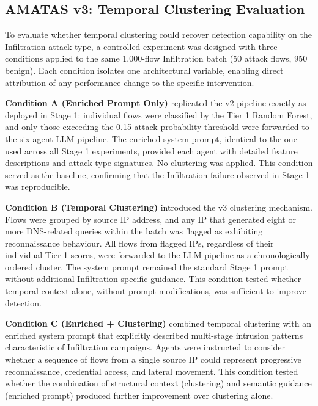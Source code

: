 \subsection{AMATAS v3: Temporal Clustering Evaluation}
\label{sec:v3-clustering}

To evaluate whether temporal clustering could recover detection capability on the Infiltration attack type, a controlled experiment was designed with three conditions applied to the same 1{,}000-flow Infiltration batch (50 attack flows, 950 benign). Each condition isolates one architectural variable, enabling direct attribution of any performance change to the specific intervention.

\textbf{Condition A (Enriched Prompt Only)} replicated the v2 pipeline exactly as deployed in Stage 1: individual flows were classified by the Tier 1 Random Forest, and only those exceeding the 0.15 attack-probability threshold were forwarded to the six-agent LLM pipeline. The enriched system prompt, identical to the one used across all Stage 1 experiments, provided each agent with detailed feature descriptions and attack-type signatures. No clustering was applied. This condition served as the baseline, confirming that the Infiltration failure observed in Stage 1 was reproducible.

\textbf{Condition B (Temporal Clustering)} introduced the v3 clustering mechanism. Flows were grouped by source IP address, and any IP that generated eight or more DNS-related queries within the batch was flagged as exhibiting reconnaissance behaviour. All flows from flagged IPs, regardless of their individual Tier 1 scores, were forwarded to the LLM pipeline as a chronologically ordered cluster. The system prompt remained the standard Stage 1 prompt without additional Infiltration-specific guidance. This condition tested whether temporal context alone, without prompt modifications, was sufficient to improve detection.

\textbf{Condition C (Enriched + Clustering)} combined temporal clustering with an enriched system prompt that explicitly described multi-stage intrusion patterns characteristic of Infiltration campaigns. Agents were instructed to consider whether a sequence of flows from a single source IP could represent progressive reconnaissance, credential access, and lateral movement. This condition tested whether the combination of structural context (clustering) and semantic guidance (enriched prompt) produced further improvement over clustering alone.

